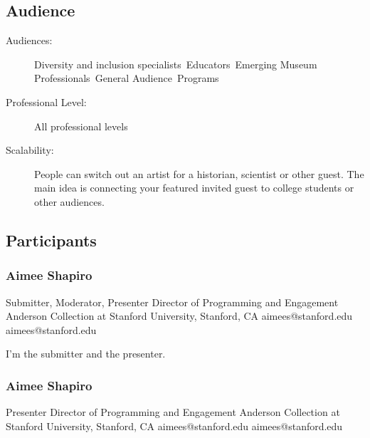 \documentclass{report}
\begin{document}
              \subsection*{Audience}
                \begin{description}
                  \item [Audiences:]Diversity and inclusion specialists~Educators~Emerging Museum Professionals~General Audience~Programs~
                  \item[Professional Level:]All professional levels~
                \item[Scalability:] People can switch out an artist for a historian, scientist or other guest. The main idea is connecting your featured invited guest to college students or other audiences.

							
              \end{description}
            \subsection*{Participants}
              \subsubsection*{ Aimee Shapiro }
              Submitter, Moderator, Presenter\newline
              Director of Programming and Engagement\newline
              Anderson Collection at Stanford University, Stanford, CA
              \newline
              aimees@stanford.edu\newline
              aimees@stanford.edu\newline

              I'm the submitter and the presenter.\newline


              

              
                \subsubsection*{ Aimee Shapiro }
                Presenter\newline
                Director of Programming and Engagement\newline
                Anderson Collection at Stanford University, Stanford, CA
                \newline
                aimees@stanford.edu\newline
                aimees@stanford.edu\newline
\end{document}
